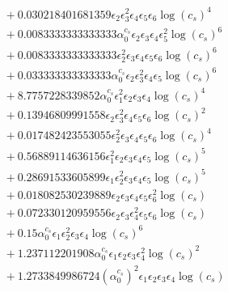 \documentclass[10pt]{article}
\begin{document}
\begin{align*}
&{}  + 0.030218401681359 \epsilon_{2} \epsilon_{3}^{2} \epsilon_{4} \epsilon_{5} \epsilon_{6} \log{\left(c_{s} \right)}^{4} \\
&{}  + 0.0083333333333333 \alpha_{0}^{c_s} \epsilon_{2} \epsilon_{3} \epsilon_{4} \epsilon_{5}^{2} \log{\left(c_{s} \right)}^{6} \\
&{}  + 0.0083333333333333 \epsilon_{2}^{2} \epsilon_{3} \epsilon_{4} \epsilon_{5} \epsilon_{6} \log{\left(c_{s} \right)}^{6} \\
&{}  + 0.033333333333333 \alpha_{0}^{c_s} \epsilon_{2} \epsilon_{3}^{2} \epsilon_{4} \epsilon_{5} \log{\left(c_{s} \right)}^{6} \\
&{}  + 8.7757228339852 \alpha_{0}^{c_s} \epsilon_{1}^{2} \epsilon_{2} \epsilon_{3} \epsilon_{4} \log{\left(c_{s} \right)}^{4} \\
&{}  + 0.13946809991558 \epsilon_{2} \epsilon_{3}^{2} \epsilon_{4} \epsilon_{5} \epsilon_{6} \log{\left(c_{s} \right)}^{2} \\
&{}  + 0.017482423553055 \epsilon_{2}^{2} \epsilon_{3} \epsilon_{4} \epsilon_{5} \epsilon_{6} \log{\left(c_{s} \right)}^{4} \\
&{}  + 0.56889114636156 \epsilon_{1}^{2} \epsilon_{2} \epsilon_{3} \epsilon_{4} \epsilon_{5} \log{\left(c_{s} \right)}^{5} \\
&{}  + 0.28691533605899 \epsilon_{1} \epsilon_{2}^{2} \epsilon_{3} \epsilon_{4} \epsilon_{5} \log{\left(c_{s} \right)}^{5} \\
&{}  + 0.018082530239889 \epsilon_{2} \epsilon_{3} \epsilon_{4} \epsilon_{5} \epsilon_{6}^{2} \log{\left(c_{s} \right)} \\
&{}  + 0.072330120959556 \epsilon_{2} \epsilon_{3} \epsilon_{4}^{2} \epsilon_{5} \epsilon_{6} \log{\left(c_{s} \right)} \\
&{}  + 0.15 \alpha_{0}^{c_s} \epsilon_{1} \epsilon_{2}^{2} \epsilon_{3} \epsilon_{4} \log{\left(c_{s} \right)}^{6} \\
&{}  + 1.237112201908 \alpha_{0}^{c_s} \epsilon_{1} \epsilon_{2} \epsilon_{3} \epsilon_{4}^{2} \log{\left(c_{s} \right)}^{2} \\
&{}  + 1.2733849986724 \left(\alpha_{0}^{c_s}\right)^{2} \epsilon_{1} \epsilon_{2} \epsilon_{3} \epsilon_{4} \log{\left(c_{s} \right)}
\end{align*}
\end{document}
